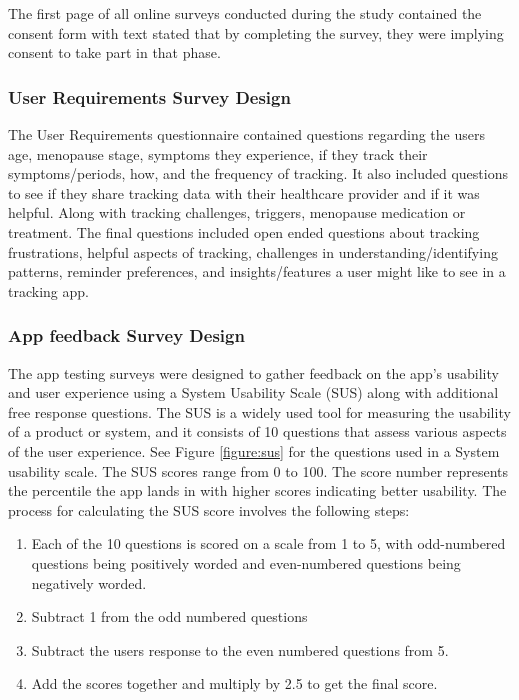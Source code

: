 The first page of all online surveys conducted during the study contained the consent form with text stated that by completing the survey, they were implying consent to take part in that phase. 

\subsubsection{User Requirements Survey Design} 

The User Requirements questionnaire contained questions regarding the users age, menopause stage, symptoms they experience, if they track their symptoms/periods, how, and the frequency of tracking. It also included questions to see if they share tracking data with their healthcare provider and if it was helpful. Along with tracking challenges, triggers, menopause medication or treatment. The final questions included open ended questions about tracking frustrations, helpful aspects of tracking, challenges in understanding/identifying patterns, reminder preferences, and insights/features a user might like to see in a tracking app. 

\subsubsection{App feedback Survey Design} 

The app testing surveys were designed to gather feedback on the app's usability and user experience using a System Usability Scale (SUS) along with additional free response questions. The SUS is a widely used tool for measuring the usability of a product or system, and it consists of 10 questions that assess various aspects of the user experience\cite{Hyzy2022}. See Figure \ref{figure:sus} for the questions used in a System usability scale. The SUS scores range from 0 to 100. The score number represents the percentile the app lands in with higher scores indicating better usability. The process for calculating the SUS score involves the following steps:
\begin{enumerate}
  \item Each of the 10 questions is scored on a scale from 1 to 5, with odd-numbered questions being positively worded and even-numbered questions being negatively worded.
  \item Subtract 1 from the odd numbered questions 
  \item Subtract the users response to the even numbered questions from 5.
  \item Add the scores together and multiply by 2.5 to get the final score.
\end{enumerate}

